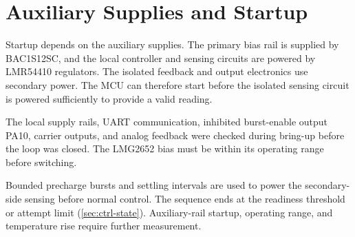 \section{Auxiliary Supplies and Startup}
\label{sec:hw-aux}

Startup depends on the auxiliary supplies. The primary bias rail is supplied by BAC1S12SC, and the local controller and sensing circuits are powered by LMR54410 regulators. The isolated feedback and output electronics use secondary power. The MCU can therefore start before the isolated sensing circuit is powered sufficiently to provide a valid reading.

The local supply rails, UART communication, inhibited burst-enable output PA10, carrier outputs, and analog feedback were checked during bring-up before the loop was closed. The LMG2652 bias must be within its operating range before switching.

Bounded precharge bursts and settling intervals are used to power the secondary-side sensing before normal control. The sequence ends at the readiness threshold or attempt limit (\cref{sec:ctrl-state}). Auxiliary-rail startup, operating range, and temperature rise require further measurement.
